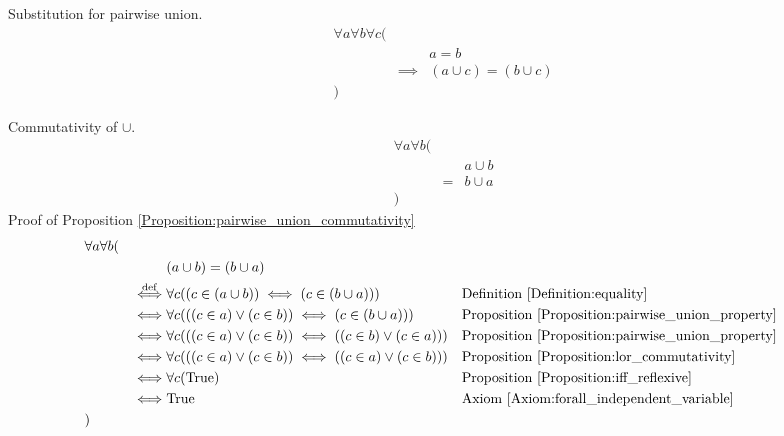 \begin{prop}
\label{Proposition:substitution_of_pairwise_union}
Substitution for pairwise union.
\begin{align*}
& \forall a \forall b \forall c ( \\
& & & a = b \\
& & \implies & (a \cup c) = (b \cup c) \\
& )
\end{align*}
\end{prop}

\begin{prop}
\label{Proposition:pairwise_union_commutativity}
Commutativity of $\cup$.
\begin{align*}
& \forall a \forall b ( \\
& & & a \cup b \\
& & = & b \cup a \\
& )
\end{align*}
Proof of Proposition \ref{Proposition:pairwise_union_commutativity}
\begin{align*}
& \forall a \forall b ( \\
& & & (a \cup b) = (b \cup a) \\
& & \overset{\operatorname{def}}{\iff} & \forall c ((c \in (a \cup b)) \iff (c \in (b \cup a)))
& & \text{Definition \ref{Definition:equality}} \\
& & \iff & \forall c (((c \in a) \lor (c \in b)) \iff (c \in (b \cup a)))
& & \text{Proposition \ref{Proposition:pairwise_union_property}} \\
& & \iff & \forall c (((c \in a) \lor (c \in b)) \iff ((c \in b) \lor (c \in a)))
& & \text{Proposition \ref{Proposition:pairwise_union_property}} \\
& & \iff & \forall c (((c \in a) \lor (c \in b)) \iff ((c \in a) \lor (c \in b)))
& & \text{Proposition \ref{Proposition:lor_commutativity}} \\
& & \iff & \forall c (\text{True})
& & \text{Proposition \ref{Proposition:iff_reflexive}} \\
& & \iff & \text{True}
& & \text{Axiom \ref{Axiom:forall_independent_variable}} \\
& )
\end{align*}
\end{prop}

